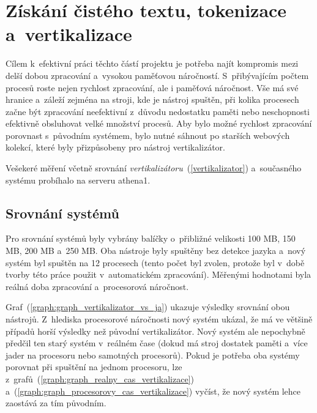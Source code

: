 \section{Získání čistého textu, tokenizace a~vertikalizace}
Cílem k~efektivní práci těchto částí projektu je potřeba najít kompromis mezi
delší dobou zpracování a~vysokou paměťovou náročností. S~přibývajícím
počtem procesů roste nejen rychlost zpracování, ale i paměťová náročnost. Vše má své hranice a~záleží zejména na stroji, kde je nástroj spuštěn, při kolika procesech začne být
zpracování neefektivní z~důvodu nedostatku paměti nebo neschopnosti efektivně obsluhovat velké
množství procesů. Aby bylo možné rychlost zpracování porovnast s~původním
systémem, bylo nutné sáhnout po starších webových kolekcí, které byly přizpůsobeny pro
nástroj vertikalizátor.

Vešekeré měření včetně srovnání \textit{vertikalizátoru}~(\ref{vertikalizator}) a~současného systému probíhalo na
serveru athena1.

\subsection{Srovnání systémů}
Pro srovnání systémů byly vybrány balíčky o~přibližné velikosti 100 MB, 150 MB,
200 MB a~250 MB. Oba nástroje byly spuštěny bez detekce jazyka a~nový systém
byl spuštěn na 12 procesech (tento počet byl zvolen, protože byl v~době tvorby této
práce použit v~automatickém zpracování). Měřenými hodnotami byla reálná doba zpracování
a~procesorová náročnost.

Graf~(\ref{graph:graph_vertikalizator_vs_ja}) ukazuje výsledky srovnání obou nástrojů.
Z~hlediska procesorové náročnosti nový systém ukázal, že má ve většině případů horší výsledky
než původní vertikalizátor. Nový systém ale nepochybně předčil ten starý systém v~reálném
čase (dokud má stroj dostatek paměti a~více jader na procesoru nebo samotných procesorů). Pokud
je potřeba oba systémy porovnat při spuštění na jednom procesoru, lze z~grafů~(\ref{graph:graph_realny_cas_vertikalizace})
a~(\ref{graph:graph_procesorovy_cas_vertikalizace}) vyčíst, že nový systém lehce zaostává
za tím původním.

